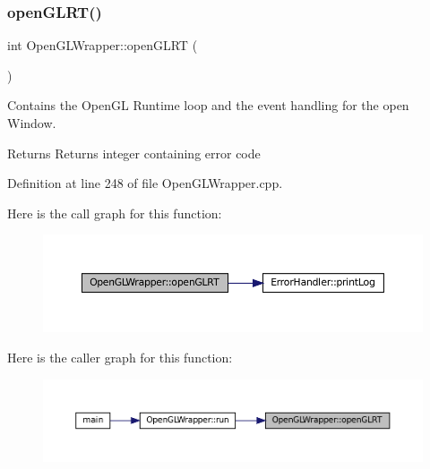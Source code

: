 \subsubsection{\texorpdfstring{openGLRT()}{openGLRT()}}
{\footnotesize\ttfamily int Open\+G\+L\+Wrapper\+::open\+G\+L\+RT (\begin{DoxyParamCaption}{ }\end{DoxyParamCaption})\hspace{0.3cm}{\ttfamily [private]}}



Contains the Open\+GL Runtime loop and the event handling for the open Window. 

\begin{DoxyReturn}{Returns}
Returns integer containing error code 
\end{DoxyReturn}


Definition at line 248 of file Open\+G\+L\+Wrapper.\+cpp.

Here is the call graph for this function\+:\nopagebreak
\begin{figure}[H]
\begin{center}
\leavevmode
\includegraphics[width=350pt]{classOpenGLWrapper_adfbe0218cff4daa4eb39cc6b53f7717f_cgraph}
\end{center}
\end{figure}
Here is the caller graph for this function\+:\nopagebreak
\begin{figure}[H]
\begin{center}
\leavevmode
\includegraphics[width=350pt]{classOpenGLWrapper_adfbe0218cff4daa4eb39cc6b53f7717f_icgraph}
\end{center}
\end{figure}
\mbox{\label{classOpenGLWrapper_aac166dc029379011ed0a29c8f6d74776}} 

